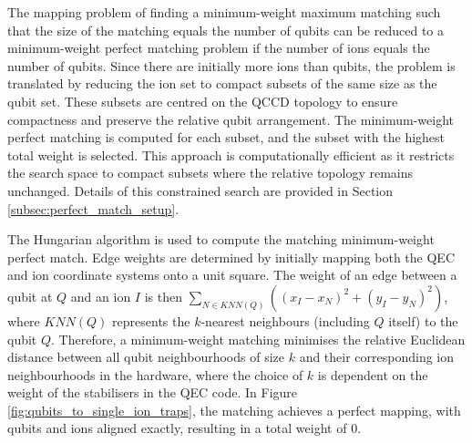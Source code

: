 \par The mapping problem of finding a minimum-weight maximum matching such that the size of the matching equals the number of qubits can be reduced to a minimum-weight perfect matching problem if the number of ions equals the number of qubits. Since there are initially more ions than qubits, the problem is translated by reducing the ion set to compact subsets of the same size as the qubit set. These subsets are centred on the QCCD topology to ensure compactness and preserve the relative qubit arrangement. The minimum-weight perfect matching is computed for each subset, and the subset with the highest total weight is selected. This approach is computationally efficient as it restricts the search space to compact subsets where the relative topology remains unchanged. Details of this constrained search are provided in Section \ref{subsec:perfect_match_setup}.

\par \label{def:edge_weights_hungarian} The Hungarian algorithm is used to compute the matching minimum-weight perfect match. Edge weights are determined by initially mapping both the QEC and ion coordinate systems onto a unit square. The weight of an edge between a qubit at \(Q\) and an ion \(I\) is then \( \sum_{N \in KNN(Q)} ((x_I - x_N)^2 + (y_I - y_N)^2)\), where \(KNN(Q)\) represents the \(k\)-nearest neighbours (including \(Q\) itself) to the qubit \(Q\). Therefore, a minimum-weight matching minimises the relative Euclidean distance between all qubit neighbourhoods of size \(k\) and their corresponding ion neighbourhoods in the hardware, where the choice of \(k\) is dependent on the weight of the stabilisers in the QEC code. In Figure \ref{fig:qubits_to_single_ion_traps}, the matching achieves a perfect mapping, with qubits and ions aligned exactly, resulting in a total weight of 0.
